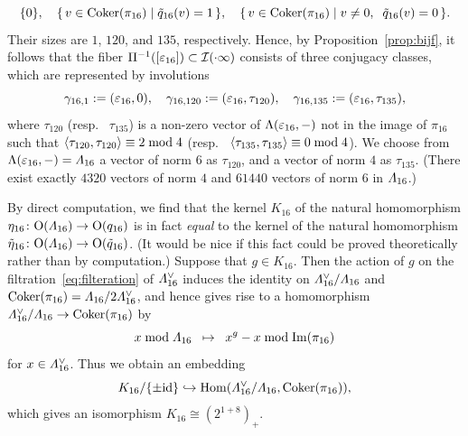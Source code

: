 \documentclass{amsart} %
\begin{document}
\[
\{0\},\quad 
\{\,{v \in\operatorname{Coker} (\pi_{16}) }\mid {\tilde{q}_{16}(v)=1} \,\},
\quad
\{\,{v \in\operatorname{Coker} (\pi_{16}) }\mid {v\ne 0, \;\; \tilde{q}_{16}(v)=0} \,\}.
\]
Their sizes are $1$, $120$, and $135$, respectively.
Hence, by Proposition~\ref{prop:bijf}, 
 it follows that  the fiber $\Pi^{-1} ([\varepsilon_{16}])\subset \mathord{\mathcal{I}}(\cdot \infty)$ consists of three conjugacy classes,
 which are 
 represented by involutions
 \[
 \gamma_{16, 1}:=(\varepsilon_{16}, 0),
 \quad
 \gamma_{16, 120}:=(\varepsilon_{16}, \tau_{120}),
 \quad
 \gamma_{16, 135}:=(\varepsilon_{16}, \tau_{135}),
 \]
where $ \tau_{120}$ (resp. ~$\tau_{135}$) is a non-zero vector of $\Lambda(\varepsilon_{16}, -)$ 
not in the image of $\pi_{16}$ 
such that
$\langle  \tau_{120}, \tau_{120} \rangle\equiv 2 \bmod 4$
 (resp. ~$\langle  \tau_{135}, \tau_{135} \rangle\equiv 0 \bmod 4$).
 We choose from $\Lambda(\varepsilon_{16}, -)=\varLambda_{16}$ a vector of norm $6$ as $\tau_{120}$,
 and a vector of norm $4$ as $\tau_{135}$.
%
(There exist exactly $4320$ vectors of norm $4$ 
and $61440$ vectors of norm $6$ 
in $\varLambda_{16}$.)
%
\begin{remark}\label{remK16}
By direct computation, 
we find that 
the kernel $K_{16}$ of the natural homomorphism $\eta_{16}\colon\mathord{\mathrm{O}}(\varLambda_{16})\to \mathord{\mathrm{O}}(q_{16})$
is in fact \emph{equal} to the kernel of the natural homomorphism 
$\tilde{\eta}_{16}\colon \mathord{\mathrm{O}}(\varLambda_{16})\to \mathord{\mathrm{O}}(\tilde{q}_{16})$.
(It would be nice if this fact could be proved theoretically rather than by computation.)
Suppose that $g\in K_{16}$.
Then 
the action of $g$ on
the filtration~\eqref{eq:filteration} of $\varLambda_{16}^{\vee}$
induces the identity on 
 $\varLambda_{16}^{\vee}/\varLambda_{16}$ and $\operatorname{Coker} (\pi_{16})=\varLambda_{16}/2\varLambda_{16}^{\vee}$, 
and hence gives rise to a homomorphism $\varLambda_{16}^{\vee}/\varLambda_{16}\to \operatorname{Coker} (\pi_{16})$
by 
\[ x \bmod \varLambda_{16} \;\;\mapsto \;\; x^g- x \bmod \operatorname{Im}(\pi_{16})
\]
for $x\in \varLambda_{16}^{\vee}$.
Thus we obtain an embedding
\[
K_{16}/\{\pm \mathord{\mathrm{id}}\}\hookrightarrow \operatorname{Hom}(\varLambda_{16}^{\vee}/\varLambda_{16}, \operatorname{Coker} (\pi_{16})), 
\]
which gives an isomorphism $K_{16}\cong (2^{1+8})_{+}$.
\end{remark}
%
%
\end{document}
